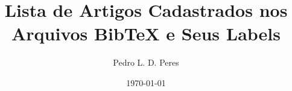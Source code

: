 \documentclass[10pt]{article}
\begin{document}
\title{Lista de Artigos Cadastrados nos Arquivos {\sc Bib\TeX} e Seus Labels}

\author{Pedro L. D. Peres}

\date{\today}

\maketitle

\nocite{*}




\end{document}
